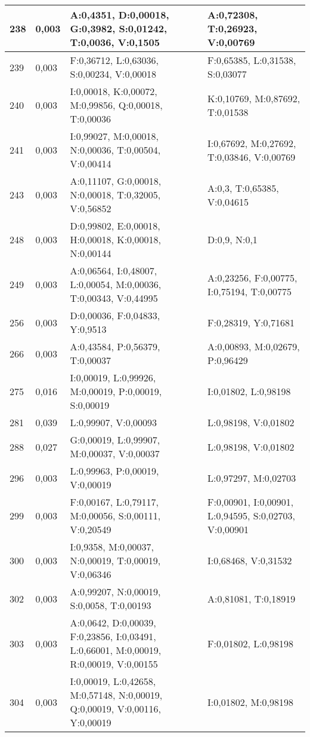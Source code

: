 \begin{landscape}
\begin{longtable}{|l|l|p{10.5cm}|p{10.5cm}|}
	238 & 0,003 & A:0,4351, D:0,00018, G:0,3982, S:0,01242, T:0,0036, V:0,1505 & A:0,72308, T:0,26923, V:0,00769 \\ \hline 
	239 & 0,003 & F:0,36712, L:0,63036, S:0,00234, V:0,00018 & F:0,65385, L:0,31538, S:0,03077 \\ \hline 
	240 & 0,003 & I:0,00018, K:0,00072, M:0,99856, Q:0,00018, T:0,00036 & K:0,10769, M:0,87692, T:0,01538 \\ \hline 
	241 & 0,003 & I:0,99027, M:0,00018, N:0,00036, T:0,00504, V:0,00414 & I:0,67692, M:0,27692, T:0,03846, V:0,00769 \\ \hline 
	243 & 0,003 & A:0,11107, G:0,00018, N:0,00018, T:0,32005, V:0,56852 & A:0,3, T:0,65385, V:0,04615 \\ \hline 
	248 & 0,003 & D:0,99802, E:0,00018, H:0,00018, K:0,00018, N:0,00144 & D:0,9, N:0,1 \\ \hline 
	249 & 0,003 & A:0,06564, I:0,48007, L:0,00054, M:0,00036, T:0,00343, V:0,44995 & A:0,23256, F:0,00775, I:0,75194, T:0,00775 \\ \hline 
	256 & 0,003 & D:0,00036, F:0,04833, Y:0,9513 & F:0,28319, Y:0,71681 \\ \hline 
	266 & 0,003 & A:0,43584, P:0,56379, T:0,00037 & A:0,00893, M:0,02679, P:0,96429 \\ \hline 
	275 & 0,016 & I:0,00019, L:0,99926, M:0,00019, P:0,00019, S:0,00019 & I:0,01802, L:0,98198 \\ \hline 
	281 & 0,039 & L:0,99907, V:0,00093 & L:0,98198, V:0,01802 \\ \hline 
	288 & 0,027 & G:0,00019, L:0,99907, M:0,00037, V:0,00037 & L:0,98198, V:0,01802 \\ \hline 
	296 & 0,003 & L:0,99963, P:0,00019, V:0,00019 & L:0,97297, M:0,02703 \\ \hline 
	299 & 0,003 & F:0,00167, L:0,79117, M:0,00056, S:0,00111, V:0,20549 & F:0,00901, I:0,00901, L:0,94595, S:0,02703, V:0,00901 \\ \hline 
	300 & 0,003 & I:0,9358, M:0,00037, N:0,00019, T:0,00019, V:0,06346 & I:0,68468, V:0,31532 \\ \hline 
	302 & 0,003 & A:0,99207, N:0,00019, S:0,0058, T:0,00193 & A:0,81081, T:0,18919 \\ \hline 
	303 & 0,003 & A:0,0642, D:0,00039, F:0,23856, I:0,03491, L:0,66001, M:0,00019, R:0,00019, V:0,00155 & F:0,01802, L:0,98198 \\ \hline 
	304 & 0,003 & I:0,00019, L:0,42658, M:0,57148, N:0,00019, Q:0,00019, V:0,00116, Y:0,00019 & I:0,01802, M:0,98198 \\ \hline 

\end{longtable}
\end{landscape}
